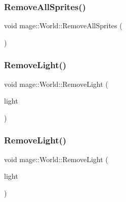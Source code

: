 \hypertarget{classmage_1_1_world_a47f677ad48d834b89ff29c9c1a82dd9f}{}\label{classmage_1_1_world_a47f677ad48d834b89ff29c9c1a82dd9f} 
\subsubsection{\texorpdfstring{Remove\+All\+Sprites()}{RemoveAllSprites()}}
{\footnotesize\ttfamily void mage\+::\+World\+::\+Remove\+All\+Sprites (\begin{DoxyParamCaption}{ }\end{DoxyParamCaption})\hspace{0.3cm}{\ttfamily [private]}}

\hypertarget{classmage_1_1_world_ab6b1c1c73bea2167277ef4dc21867eca}{}\label{classmage_1_1_world_ab6b1c1c73bea2167277ef4dc21867eca} 
\subsubsection{\texorpdfstring{Remove\+Light()}{RemoveLight()}\hspace{0.1cm}{\footnotesize\ttfamily [1/2]}}
{\footnotesize\ttfamily void mage\+::\+World\+::\+Remove\+Light (\begin{DoxyParamCaption}\item[{\hyperlink{namespacemage_a1e01ae66713838a7a67d30e44c67703e}{Shared\+Ptr}$<$ \hyperlink{namespacemage_a5d71843ded3749108547eba2a5ce4d85}{Omni\+Light\+Node} $>$}]{light }\end{DoxyParamCaption})\hspace{0.3cm}{\ttfamily [private]}}

\hypertarget{classmage_1_1_world_abd02b5bf5960e152c272086d364508fa}{}\label{classmage_1_1_world_abd02b5bf5960e152c272086d364508fa} 
\subsubsection{\texorpdfstring{Remove\+Light()}{RemoveLight()}\hspace{0.1cm}{\footnotesize\ttfamily [2/2]}}
{\footnotesize\ttfamily void mage\+::\+World\+::\+Remove\+Light (\begin{DoxyParamCaption}\item[{\hyperlink{namespacemage_a1e01ae66713838a7a67d30e44c67703e}{Shared\+Ptr}$<$ \hyperlink{namespacemage_ab9f49a82dd438032bb38c5436a657335}{Spot\+Light\+Node} $>$}]{light }\end{DoxyParamCaption})\hspace{0.3cm}{\ttfamily [private]}}

